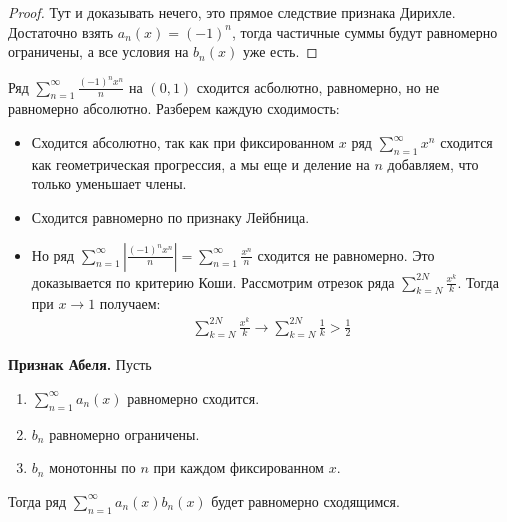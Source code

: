 \begin{proof}
    Тут и доказывать нечего, это прямое следствие признака Дирихле.
    Достаточно взять $a_n(x) = (-1)^n$, тогда частичные суммы будут равномерно ограничены, а все условия на $b_n(x)$ уже есть.
\end{proof}

\begin{example}
    Ряд $\sum\limits_{n = 1}^\infty \frac{(-1)^nx^n}{n}$ на $(0, 1)$ сходится асболютно, равномерно, но не равномерно абсолютно.
    Разберем каждую сходимость: \begin{itemize}
        \item Сходится абсолютно, так как при фиксированном $x$ ряд $\sum\limits_{n=1}^\infty x^n$ сходится как геометрическая прогрессия, а мы еще и деление на $n$ добавляем, что только уменьшает члены.
        \item Сходится равномерно по признаку Лейбница.
        \item Но ряд $\sum\limits_{n = 1}^\infty \left|\frac{(-1)^nx^n}{n}\right| = \sum\limits_{n = 1}^\infty \frac{x^n}{n}$ сходится не равномерно.
        Это доказывается по критерию Коши. 
        Рассмотрим отрезок ряда $\sum\limits_{k = N}^{2N} \frac{x^k}{k}$.
        Тогда при $x \to 1$ получаем:
        \begin{gather*}
            \sum\limits_{k = N}^{2N} \frac{x^k}{k} \to \sum\limits_{k = N}^{2N} \frac{1}{k} > \frac{1}{2}
        \end{gather*}
    \end{itemize}
\end{example}

\vspace*{3mm}

\textbf{Признак Абеля.} Пусть \begin{enumerate}
    \item $\sum\limits_{n = 1}^\infty a_n(x)$ равномерно сходится.
    \item $b_n$ равномерно ограничены.
    \item $b_n$ монотонны по $n$ при каждом фиксированном $x$.
\end{enumerate}
Тогда ряд $\sum\limits_{n = 1}^\infty a_n(x)b_n(x)$ будет равномерно сходящимся.

